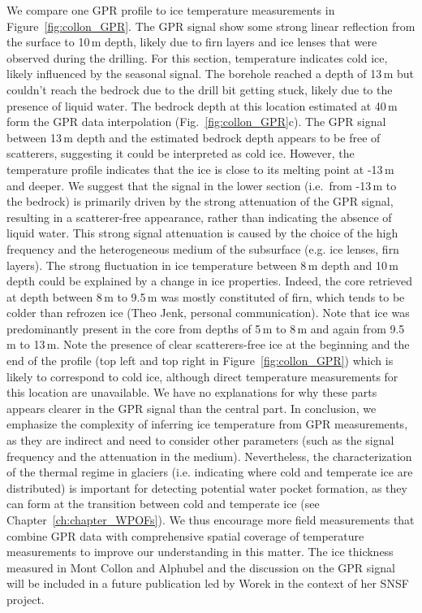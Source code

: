 We compare one GPR profile to ice temperature measurements in Figure~\ref{fig:collon_GPR}. The GPR signal show some strong linear reflection from the surface to 10\,m depth, likely due to firn layers and ice lenses that were observed during the drilling. For this section, temperature indicates cold ice, likely influenced by the seasonal signal. The borehole reached a depth of 13\,m but couldn't reach the bedrock due to the drill bit getting stuck, likely due to the presence of liquid water. The bedrock depth at this location estimated at 40\,m form the GPR data interpolation (Fig.~\ref{fig:collon_GPR}c). The GPR signal between 13\,m depth and the estimated bedrock depth appears to be free of scatterers, suggesting it could be interpreted as cold ice. However, the temperature profile indicates that the ice is close to its melting point at -13\,m and deeper. We suggest that the signal in the lower section (i.e.\ from -13\,m to the bedrock) is primarily driven by the strong attenuation of the GPR signal, resulting in a scatterer-free appearance, rather than indicating the absence of liquid water. This strong signal attenuation is caused by the choice of the high frequency and the heterogeneous medium of the subsurface (e.g. ice lenses, firn layers). 
% 
The strong fluctuation in ice temperature between 8\,m depth and 10\,m depth could be explained by a change in ice properties. Indeed, the core retrieved at depth between 8\,m to 9.5\,m was mostly constituted of firn, which tends to be colder than refrozen ice (Theo Jenk, personal communication). Note that ice was predominantly present in the core from depths of 5\,m to 8\,m and again from 9.5\,m to 13\,m.
%
Note the presence of clear scatterers-free ice at the beginning and the end of the profile (top left and top right in Figure~\ref{fig:collon_GPR}) which is likely to correspond to cold ice, although direct temperature measurements for this location are unavailable. We have no explanations for why these parts appears clearer in the GPR signal than the central part. 
%
In conclusion, we emphasize the complexity of inferring ice temperature from GPR measurements, as they are indirect and need to consider other parameters (such as the signal frequency and the attenuation in the medium). Nevertheless, the characterization of the thermal regime in glaciers (i.e. indicating where cold and temperate ice are distributed) is important for detecting potential water pocket formation, as they can form at the transition between cold and temperate ice (see Chapter~\ref{ch:chapter_WPOFs}). We thus encourage more field measurements that combine GPR data with comprehensive spatial coverage of temperature measurements to improve our understanding in this matter. The ice thickness measured in Mont Collon and Alphubel and the discussion on the GPR signal will be included in a future publication led by Worek in the context of her SNSF project.


